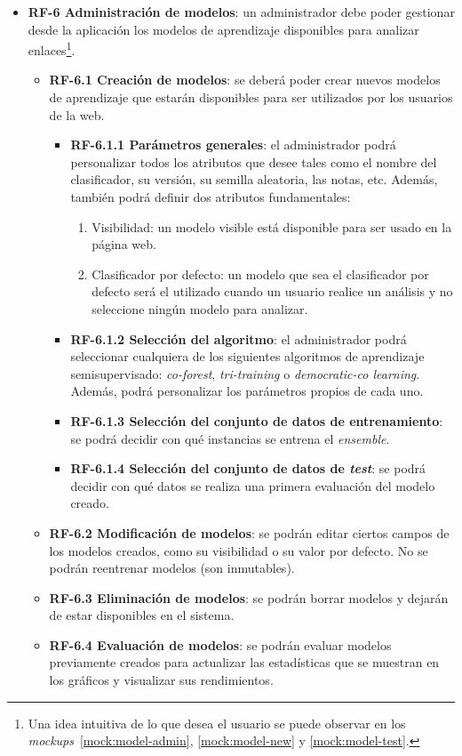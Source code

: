 \begin{itemize}
	\item \textbf{RF-6 Administración de modelos}: un administrador debe poder gestionar desde la aplicación los modelos de aprendizaje disponibles para analizar enlaces\footnote{Una idea intuitiva de lo que desea el usuario se puede observar en los \textit{mockups}~\ref{mock:model-admin}, \ref{mock:model-new} y \ref{mock:model-test}.}.
	\begin{itemize}
	\item \textbf{RF-6.1 Creación de modelos}: se deberá poder crear nuevos modelos de aprendizaje que estarán disponibles para ser utilizados por los usuarios de la web.
	\begin{itemize}
		\item \textbf{RF-6.1.1 Parámetros generales}: el administrador podrá personalizar todos los atributos que desee tales como el nombre del clasificador, su versión, su semilla aleatoria, las notas, etc. Además, también podrá definir dos atributos fundamentales:
		\begin{enumerate}
			\item Visibilidad: un modelo visible está disponible para ser usado en la página web.
			\item Clasificador por defecto: un modelo que sea el clasificador por defecto será el utilizado cuando un usuario realice un análisis y no seleccione ningún modelo para analizar.
		\end{enumerate}
		\item \textbf{RF-6.1.2 Selección del algoritmo}: el administrador podrá seleccionar cualquiera de los siguientes algoritmos de aprendizaje semisupervisado: \textit{co-forest}, \textit{tri-training} o \textit{democratic-co learning}. Además, podrá personalizar los parámetros propios de cada uno.
		\item \textbf{RF-6.1.3 Selección del conjunto de datos de entrenamiento}: se podrá decidir con qué instancias se entrena el \textit{ensemble}.
		\item \textbf{RF-6.1.4 Selección del conjunto de datos de \textit{test}}: se podrá decidir con qué datos se realiza una primera evaluación del modelo creado.
	\end{itemize}
	
	\item \textbf{RF-6.2 Modificación de modelos}: se podrán editar ciertos campos de los modelos creados, como su visibilidad o su valor por defecto. No se podrán reentrenar modelos (son inmutables).
	\item \textbf{RF-6.3 Eliminación de modelos}: se podrán borrar modelos y dejarán de estar disponibles en el sistema.
	\item \textbf{RF-6.4 Evaluación de modelos}: se podrán evaluar modelos previamente creados para actualizar las estadísticas que se muestran en los gráficos y visualizar sus rendimientos.
	\end{itemize}

\end{itemize}

